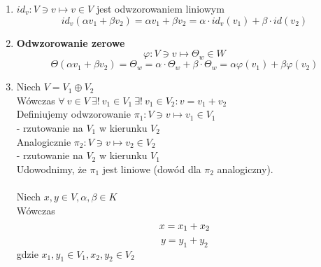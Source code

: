 \documentclass[a5paper,8pt]{article}
\newcommand\tab[1][1cm]{\hspace*{#1}}
\begin{document}
    \begin{enumerate}
        \item
            $ id_v: V \ni v \longmapsto v \in V $ jest odwzorowaniem liniowym
            \begin{equation*}
                id_v(\alpha v_1 + \beta v_2) = \alpha v_1 + \beta v_2
                = \alpha \cdot id_v (v_1) + \beta \cdot id(v_2)
            \end{equation*}
        \item
            \textbf{Odwzorowanie zerowe} \\
            \begin{equation*}
                \varphi: V \ni v \longmapsto \Theta_w \in W
            \end{equation*}
            \begin{equation*}
                \Theta(\alpha v_1 + \beta v_2) = \Theta_w
                = \alpha \cdot \Theta_w + \beta \cdot \Theta_w
                = \alpha \varphi(v_1) + \beta \varphi(v_2)
            \end{equation*}
        \item
            Niech $ V = V_1 \oplus V_2 $ \\
            Wówczas $ \forall ~v \in V ~ \exists! ~ v_1 \in V_1 ~ \exists! ~ v_1 \in V_2:
            v = v_1 + v_2 $ \\

            Definiujemy odwzorowanie $ \pi_1 : V \ni v \longmapsto v_1 \in V_1 $ \\
            \tab - rzutowanie na $ V_1 $ w kierunku $ V_2 $ \\

            Analogicznie $ \pi_2 : V \ni v \longmapsto v_2 \in V_2 $ \\
            \tab - rzutowanie na $ V_2 $ w kierunku $ V_1 $ \\

            \newpage
            Udowodnimy, że $\pi_1$ jest liniowe (dowód dla $\pi_2$ analogiczny).\\\\
            Niech $ x, y \in V, \alpha , \beta \in K $\\
            Wówczas \\
            \begin{equation*}
                x = x_1 + x_2 \\
            \end{equation*}
            \begin{equation*}
                y = y_1 + y_2
            \end{equation*}
                gdzie $ x_1, y_1 \in V_1, x_2, y_2 \in V_2 $


\end{enumerate}
\end{document}
